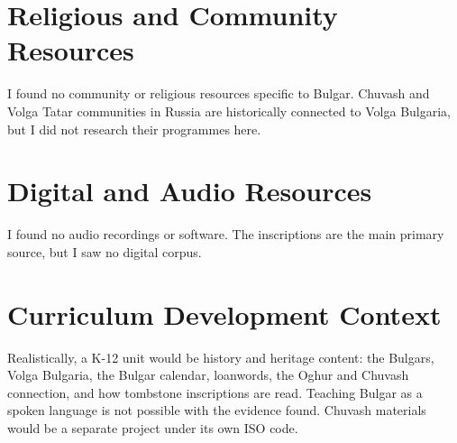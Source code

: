 \documentclass[12pt]{article}
\begin{document}
\section{Religious and Community Resources}
I found no community or religious resources specific to Bulgar. Chuvash and Volga Tatar communities in Russia are historically connected to Volga Bulgaria, but I did not research their programmes here.

\section{Digital and Audio Resources}
I found no audio recordings or software. The inscriptions are the main primary source, but I saw no digital corpus.

\section{Curriculum Development Context}
Realistically, a K-12 unit would be history and heritage content: the Bulgars, Volga Bulgaria, the Bulgar calendar, loanwords, the Oghur and Chuvash connection, and how tombstone inscriptions are read. Teaching Bulgar as a spoken language is not possible with the evidence found. Chuvash materials would be a separate project under its own ISO code.
\end{document}
